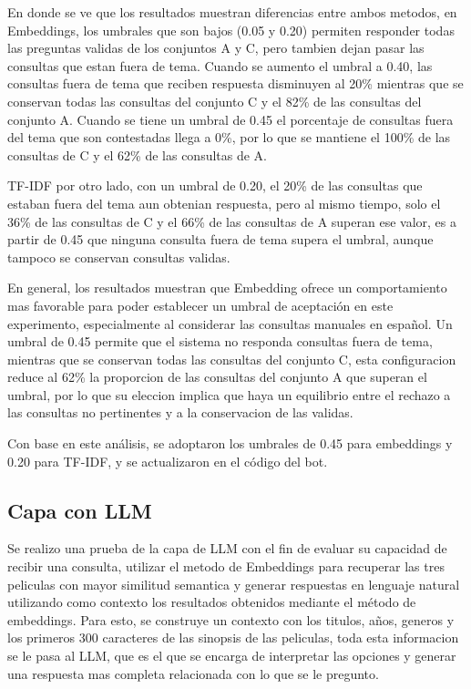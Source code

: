 En donde se ve que los resultados muestran diferencias entre ambos metodos, en Embeddings, los umbrales que son bajos (0.05 y 0.20) permiten responder todas las preguntas validas de los conjuntos A y C, pero tambien dejan pasar las consultas que estan fuera de tema. Cuando se aumento el umbral a 0.40, las consultas fuera de tema que reciben respuesta disminuyen al 20\% mientras que se conservan todas las consultas del conjunto C y el 82\% de las consultas del conjunto A. Cuando se tiene un umbral de 0.45 el porcentaje de consultas fuera del tema que son contestadas llega a 0\%, por lo que se mantiene el 100\% de las consultas de C y el 62\% de las consultas de A.

TF-IDF por otro lado, con un umbral de 0.20, el 20\% de las consultas que estaban fuera del tema aun obtenian respuesta, pero al mismo tiempo, solo el 36\% de las consultas de C y el 66\% de las consultas de A  superan ese valor, es a partir de 0.45 que ninguna consulta fuera de tema supera el umbral, aunque tampoco se conservan consultas validas.

En general, los resultados muestran que Embedding ofrece un comportamiento mas favorable para poder establecer un umbral de aceptación en este experimento, especialmente al considerar las consultas manuales en español. Un umbral de 0.45 permite que el sistema no responda consultas fuera de tema, mientras que se conservan todas las consultas del conjunto C, esta configuracion reduce al 62\% la proporcion de las consultas del conjunto A que superan el umbral, por lo que su eleccion implica que haya un equilibrio entre el rechazo a las consultas no pertinentes y a la conservacion de las validas.

Con base en este análisis, se adoptaron los umbrales de 0.45 para embeddings y 0.20 para TF-IDF, y se actualizaron en el código del bot.

\subsection{Capa con LLM}
Se realizo una prueba de la capa de LLM con el fin de evaluar su capacidad de recibir una consulta, utilizar el metodo de Embeddings para recuperar las tres peliculas con mayor similitud semantica y generar respuestas en lenguaje natural utilizando como contexto los resultados obtenidos mediante el método de embeddings. Para esto, se construye un contexto con los titulos, años, generos y los primeros 300 caracteres de las sinopsis de las peliculas, toda esta informacion se le pasa al LLM, que es el que se encarga de interpretar las opciones y generar una respuesta mas completa relacionada con lo que se le pregunto.

